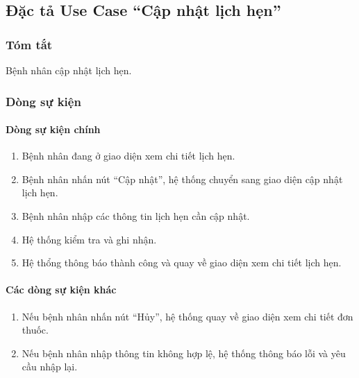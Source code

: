 \subsection{Đặc tả Use Case ``Cập nhật lịch hẹn''}

\subsubsection{Tóm tắt}
Bệnh nhân cập nhật lịch hẹn.

\subsubsection{Dòng sự kiện}
\paragraph{\textbf{Dòng sự kiện chính}}
\begin{enumerate}
  \item Bệnh nhân đang ở giao diện xem chi tiết lịch hẹn.
  \item Bệnh nhân nhấn nút ``Cập nhật'', hệ thống chuyển sang giao diện cập nhật lịch hẹn.
  \item Bệnh nhân nhập các thông tin lịch hẹn cần cập nhật.
  \item Hệ thống kiểm tra và ghi nhận.
  \item Hệ thổng thông báo thành công và quay về giao diện xem chi tiết lịch hẹn.
\end{enumerate}

\paragraph{\textbf{Các dòng sự kiện khác}}
\begin{enumerate}
  \item Nếu bệnh nhân nhấn nút ``Hủy'', hệ thống quay về giao diện xem chi tiết đơn thuốc.
  \item Nếu bệnh nhân nhập thông tin không hợp lệ, hệ thống thông báo lỗi và yêu cầu nhập lại.
\end{enumerate}

